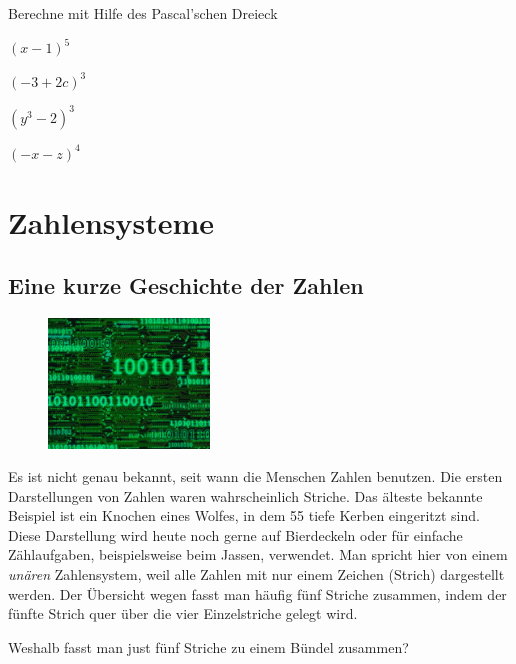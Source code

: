 \documentclass[%
11pt,%
twoside,%
titlepage,%
german,%
]{scrartcl}
\begin{document}
\begin{ueb}
Berechne mit Hilfe des Pascal'schen Dreieck

\begin{minipage}{0.23\textwidth}
\begin{enumeratea}
\item $(x-1)^5$
\item $(-3+2c)^3$
\end{enumeratea}
\end{minipage}
\begin{minipage}{0.23\textwidth}
\begin{enumeratea}
\addtocounter{enumi}{2}
\item $(y^3-2)^3$
\item $(-x-z)^4$
\end{enumeratea}
\end{minipage}
\end{ueb}

\cleardoublepage

\section{Zahlensysteme}

\subsection{Eine kurze Geschichte der Zahlen}

\begin{figure}
  \begin{center}
    \includegraphics[width=0.382\textwidth]{pictures/binary}
  \end{center}
\end{figure}
Es ist nicht genau bekannt, seit wann die Menschen Zahlen benutzen. Die ersten Darstellungen von Zahlen waren wahrscheinlich Striche. Das \"alteste bekannte Beispiel ist ein Knochen eines Wolfes, in dem 55 tiefe Kerben eingeritzt sind. Diese Darstellung wird heute noch gerne auf Bierdeckeln oder f\"ur einfache Z\"ahlaufgaben, beispielsweise beim Jassen, verwendet. Man spricht hier von einem \emph{un\"aren} Zahlensystem, weil alle Zahlen mit nur einem Zeichen (Strich) dargestellt werden. Der \"Ubersicht wegen fasst man h\"aufig f\"unf Striche zusammen, indem der f\"unfte Strich quer \"uber die vier Einzelstriche gelegt wird.
\begin{ueb}
Weshalb fasst man just f\"unf Striche zu einem B\"undel zusammen?
\end{ueb}
\end{document}
